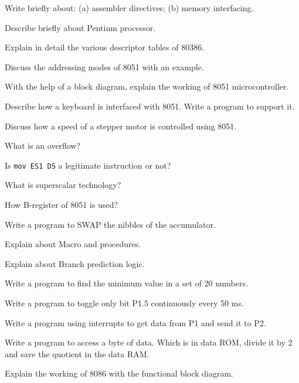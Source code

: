 \newpage \again

\item Write briefly about: (a) assembler directives; (b) memory interfacing.
\ene

\item \iitem Describe briefly about Pentium processor.
\Or
\item Explain in detail the various descriptor tables of 80386.
\ene

\item \iitem Discuss the addressing modes of 8051 with an example.
\Or
\item With the help of a block diagram, explain the working of 8051 microcontroller.
\ene

\item \iitem Describe how a keyboard is interfaced with 8051. Write a program to support it.
\Or
\item Discuss how a speed of a stepper motor is controlled using 8051.
\ene

\markC
\ene

\newpage

\sub{\subj}
\maxtime

\partA

\iitem What is an overflow?
\item Is {\tt mov ES1 DS} a legitimate instruction or not?
\item What is superscalar technology?
\item How B-register of 8051 is used?
\item Write a program to SWAP the nibbles of the accumulator.

\markA
\partB

\item Explain about Macro and procedures.
\item Explain about Branch prediction logic.
\item Write a program to find the minimum value in a set of 20 numbers.
\item Write a program to toggle only bit P1.5 continuously every 50 ms.
\item Write a program using interrupts to get data from P1 and send it to P2.
\item Write a program to access a byte of data. Which is in data ROM, divide it by
  2 and save the quotient in the data RAM.

\markB
\partC

\item \iitem Explain the working of 8086 with the functional block diagram.
\Or

